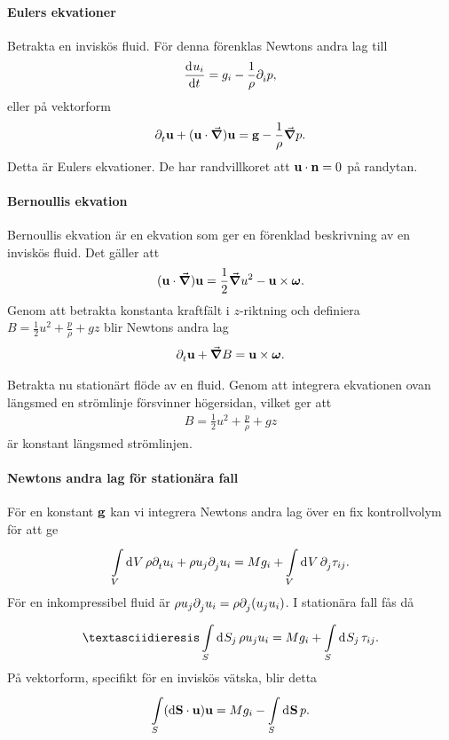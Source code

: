 \paragraph{Eulers ekvationer}
Betrakta en inviskös fluid. För denna förenklas Newtons andra lag till
\begin{align*}
	\dv[]{u_{i}}{t} = g_{i} - \frac{1}{\rho}\partial_{i}^{}p,
\end{align*}
eller på vektorform
\begin{align*}
	\partial_{t}^{}\vb{u} + (\vb{u}\cdot\grad)\vb{u} = \vb{g} - \frac{1}{\rho}\grad{p}.
\end{align*}
Detta är Eulers ekvationer. De har randvillkoret att $\vb{u}\cdot\vb{n} = 0$ på randytan.

\paragraph{Bernoullis ekvation}
Bernoullis ekvation är en ekvation som ger en förenklad beskrivning av en inviskös fluid. Det gäller att
\begin{align*}
	(\vb{u}\cdot\grad)\vb{u} = \frac{1}{2}\grad{u^{2}} - \vb{u}\times\vb*{\omega}.
\end{align*}
Genom att betrakta konstanta kraftfält i $z$-riktning och definiera $B = \frac{1}{2}u^{2} + \frac{p}{\rho} + gz$ blir Newtons andra lag
\begin{align*}
	\partial_{t}^{}\vb{u} + \grad{B} = \vb{u}\times\vb*{\omega}.
\end{align*}

Betrakta nu stationärt flöde av en fluid. Genom att integrera ekvationen ovan längsmed en strömlinje försvinner högersidan, vilket ger att
\begin{align*}
	B = \frac{1}{2}u^{2} + \frac{p}{\rho} + gz
\end{align*}
är konstant längsmed strömlinjen.

\paragraph{Newtons andra lag för stationära fall}
För en konstant $\vb{g}$ kan vi integrera Newtons andra lag över en fix kontrollvolym för att ge
\begin{align*}
	\int\limits_{V}^{}\dd[]{V}\rho\partial_{t}^{}u_{i} + \rho u_{j}\partial_{j}^{}u_{i} = Mg_{i} + \int\limits_{V}^{}\dd[]{V}\partial_{j}^{}\tau_{ij}.
\end{align*}
För en inkompressibel fluid är $\rho u_{j}\partial_{j}^{}u_{i} = \rho \partial_{j}^{}(u_{j}u_{i})$. I stationära fall fås då
\begin{align*}
¨	\integ{S}{}{S_{j}}{\rho u_{j}u_{i}} = Mg_{i} + \integ{S}{}{S_{j}}{\tau_{ij}}.
\end{align*}
På vektorform, specifikt för en inviskös vätska, blir detta
\begin{align*}
	\int\limits_{S}(\dd{\vb{S}}\cdot\vb{u})\vb{u} = Mg_{i} - \int\limits_{S}^{}\dd[]{\vb{S}}p.
\end{align*}

